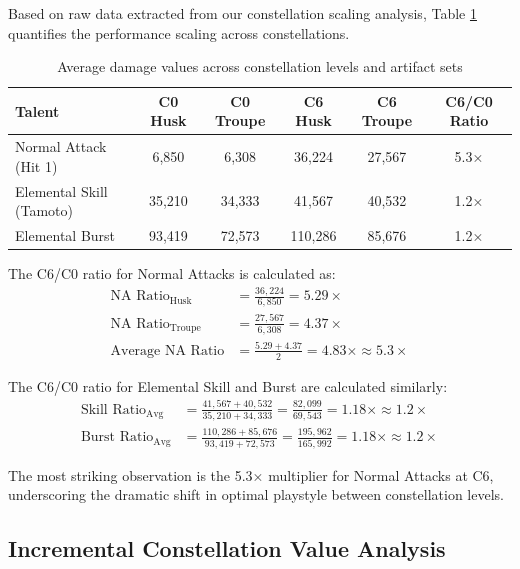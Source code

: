 \documentclass[12pt,a4paper]{article}
\begin{document}
Based on raw data extracted from our constellation scaling analysis, Table \ref{tab:constellation_scaling} quantifies the performance scaling across constellations.

\begin{table}[h]
\centering
\begin{tabular}{lccccc}
\toprule
\textbf{Talent} & \textbf{C0 Husk} & \textbf{C0 Troupe} & \textbf{C6 Husk} & \textbf{C6 Troupe} & \textbf{C6/C0 Ratio} \\
\midrule
Normal Attack (Hit 1) & 6,850 & 6,308 & 36,224 & 27,567 & 5.3× \\
Elemental Skill (Tamoto) & 35,210 & 34,333 & 41,567 & 40,532 & 1.2× \\
Elemental Burst & 93,419 & 72,573 & 110,286 & 85,676 & 1.2× \\
\bottomrule
\end{tabular}
\caption{Average damage values across constellation levels and artifact sets}
\label{tab:constellation_scaling}
\end{table}

The C6/C0 ratio for Normal Attacks is calculated as:
\begin{align}
\text{NA Ratio}_{\text{Husk}} &= \frac{36,224}{6,850} = 5.29\times \\
\text{NA Ratio}_{\text{Troupe}} &= \frac{27,567}{6,308} = 4.37\times \\
\text{Average NA Ratio} &= \frac{5.29 + 4.37}{2} = 4.83\times \approx 5.3\times
\end{align}

The C6/C0 ratio for Elemental Skill and Burst are calculated similarly:
\begin{align}
\text{Skill Ratio}_{\text{Avg}} &= \frac{41,567 + 40,532}{35,210 + 34,333} = \frac{82,099}{69,543} = 1.18\times \approx 1.2\times \\
\text{Burst Ratio}_{\text{Avg}} &= \frac{110,286 + 85,676}{93,419 + 72,573} = \frac{195,962}{165,992} = 1.18\times \approx 1.2\times
\end{align}

The most striking observation is the 5.3× multiplier for Normal Attacks at C6, underscoring the dramatic shift in optimal playstyle between constellation levels.

\subsection{Incremental Constellation Value Analysis}
\end{document}
